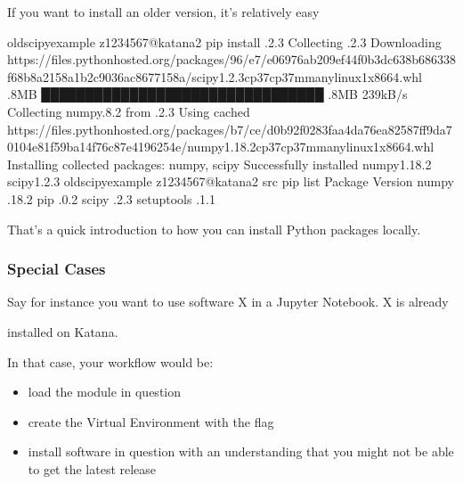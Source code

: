 \documentclass[letterpaper,10pt,english]{sphinxmanual}
\begin{document}
If you want to install an older version, it’s relatively easy

\begin{sphinxVerbatim}[commandchars=\\\{\}]
old\PYGZhy{}scipy\PYGZhy{}example \PYG{o}{[}z1234567@katana2 \PYGZti{}\PYG{o}{]}\PYGZdl{} pip install .2.3
Collecting .2.3
  Downloading https://files.pythonhosted.org/packages/96/e7/e06976ab209ef44f0b3dc638b686338f68b8a2158a1b2c9036ac8677158a/scipy\PYGZhy{}1.2.3\PYGZhy{}cp37\PYGZhy{}cp37m\PYGZhy{}manylinux1\PYGZus{}x86\PYGZus{}64.whl .8MB
    \PYGZpc{} ████████████████████████████████ .8MB 239kB/s
Collecting numpy\PYGZgt{}.8.2 from .2.3
  Using cached https://files.pythonhosted.org/packages/b7/ce/d0b92f0283faa4da76ea82587ff9da70104e81f59ba14f76c87e4196254e/numpy\PYGZhy{}1.18.2\PYGZhy{}cp37\PYGZhy{}cp37m\PYGZhy{}manylinux1\PYGZus{}x86\PYGZus{}64.whl
Installing collected packages: numpy, scipy
Successfully installed numpy\PYGZhy{}1.18.2 scipy\PYGZhy{}1.2.3
old\PYGZhy{}scipy\PYGZhy{}example \PYG{o}{[}z1234567@katana2 src\PYG{o}{]}\PYGZdl{} pip list
Package    Version
\PYGZhy{}\PYGZhy{}\PYGZhy{}\PYGZhy{}\PYGZhy{}\PYGZhy{}\PYGZhy{}\PYGZhy{}\PYGZhy{}\PYGZhy{} \PYGZhy{}\PYGZhy{}\PYGZhy{}\PYGZhy{}\PYGZhy{}\PYGZhy{}\PYGZhy{}
numpy      .18.2
pip        .0.2
scipy      .2.3
setuptools .1.1
\end{sphinxVerbatim}

That’s a quick introduction to how you can install Python packages locally.


\subsubsection{Special Cases}
\label{\detokenize{software/python-virtualenvs:special-cases}}
Say for instance you want to use software X in a Jupyter Notebook. X is already

installed on Katana.

In that case, your workflow would be:
\begin{itemize}
\item {} 
load the module in question

\item {} 
create the Virtual Environment with the flag 

\item {} 
install software in question with an understanding that you might not be able to get the latest release

\end{itemize}
\end{document}

